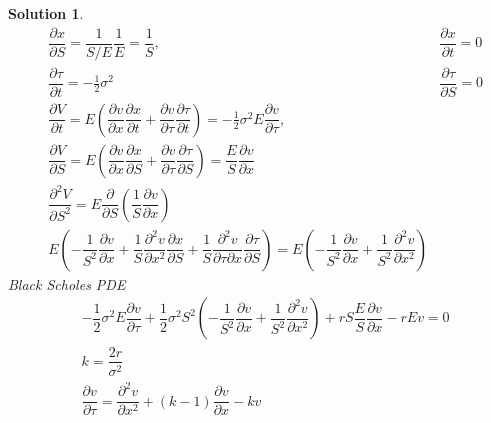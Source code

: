 \documentclass[16pt]{article}
\newtheorem{sol}{Solution}[section]
\begin{document}
\begin{sol}
		\begin{eqnarray*}
			&\dfrac{\partial x}{\partial S}  = \dfrac{1}{S/E}  \dfrac{1}{E}  = \dfrac{1}{S},
			   &\dfrac{\partial x}{\partial t}  = 0 \\
			& \dfrac{\partial \tau}{\partial t} = -\frac{1}{2} \sigma^2  &\dfrac{\partial \tau}{\partial S} = 0\\
			&\dfrac{\partial V}{\partial t} = E \left(\dfrac{\partial v}{\partial x }\dfrac{\partial x}{\partial t} + \dfrac{\partial v}{ \partial \tau}\dfrac{\partial \tau}{\partial t}\right) = -\frac{1}{2} \sigma^2 E \dfrac{\partial v}{\partial \tau}, \\
			&\dfrac{\partial V}{\partial S} = E \left(\dfrac{\partial v}{\partial x }\dfrac{\partial x}{\partial S} + \dfrac{\partial v}{ \partial \tau}\dfrac{\partial \tau}{\partial S}\right) = \dfrac{E}{S} \dfrac{\partial v}{\partial x} \\
			&\dfrac{\partial^2 V}{\partial S^2}  = E \dfrac{\partial}{\partial S}\left(\dfrac{1}{S}\dfrac{\partial v}{\partial x}\right) \\
			& E \left(-\dfrac{1}{S^2} \dfrac{\partial v}{\partial x} + \dfrac{1}{S} \dfrac{\partial^2 v}{\partial x^2}\dfrac{\partial x}{\partial S} + \dfrac{1}{S} \dfrac{\partial^2 v}{\partial \tau \partial x} \dfrac{\partial \tau}{\partial S}\right) 
			 = E \left(- \dfrac{1}{S^2} \dfrac{\partial v}{\partial x} + \dfrac{1}{S^2} \dfrac{\partial^2 v}{\partial x^2}\right)
		\end{eqnarray*}
		Black Scholes PDE
		\begin{eqnarray*}
			&-\dfrac{1}{2} \sigma^2 E \dfrac{\partial v}{\partial \tau} + \dfrac{1}{2} \sigma^2 S^2 \left(- \dfrac{1}{S^2} \dfrac{\partial v}{\partial x} + \dfrac{1}{S^2} \dfrac{\partial^2 v}{\partial x^2}\right) + rS \dfrac{E}{S} \dfrac{\partial v}{\partial x} - rEv =0 \\
			&k = \dfrac{2r}{\sigma^2} \\
			& \dfrac{\partial v}{\partial \tau} = \dfrac{\partial^2 v}{\partial x^2} + (k - 1)\dfrac{\partial v}{\partial x} - kv
		\end{eqnarray*}
	

\end{sol}
\end{document}
